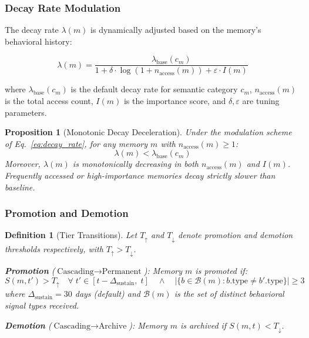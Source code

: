\documentclass[11pt,a4paper]{article}
\newtheorem{definition}{Definition}
\newtheorem{proposition}{Proposition}
\begin{document}
\subsubsection{Decay Rate Modulation}

The decay rate $\lambda(m)$ is dynamically adjusted based on the memory's behavioral history:

\begin{equation}
\lambda(m) = \frac{\lambda_{\text{base}}(c_m)}{1 + \delta \cdot \log(1 + n_{\text{access}}(m)) + \varepsilon \cdot I(m)}
\label{eq:decay_rate}
\end{equation}

\noindent where $\lambda_{\text{base}}(c_m)$ is the default decay rate for semantic category $c_m$, $n_{\text{access}}(m)$ is the total access count, $I(m)$ is the importance score, and $\delta, \varepsilon$ are tuning parameters.

\begin{proposition}[Monotonic Decay Deceleration]
Under the modulation scheme of Eq.~\ref{eq:decay_rate}, for any memory $m$ with $n_{\text{access}}(m) \geq 1$:
$$\lambda(m) < \lambda_{\text{base}}(c_m)$$
Moreover, $\lambda(m)$ is monotonically decreasing in both $n_{\text{access}}(m)$ and $I(m)$. Frequently accessed or high-importance memories decay strictly slower than baseline.
\end{proposition}

\subsubsection{Promotion and Demotion}

\begin{definition}[Tier Transitions]
\label{def:transitions}
Let $T_{\uparrow}$ and $T_{\downarrow}$ denote promotion and demotion thresholds respectively, with $T_{\uparrow} > T_{\downarrow}$.

\textbf{Promotion} ($\text{Cascading} \to \text{Permanent}$): Memory $m$ is promoted if:
\begin{equation}
S(m, t') > T_{\uparrow} \quad \forall \; t' \in [t - \Delta_{\text{sustain}}, \; t] \quad \wedge \quad |\{b \in \mathcal{B}(m) : b.\text{type} \neq b'.\text{type}\}| \geq 3
\label{eq:promotion}
\end{equation}
where $\Delta_{\text{sustain}} = 30$ days (default) and $\mathcal{B}(m)$ is the set of distinct behavioral signal types received.

\textbf{Demotion} ($\text{Cascading} \to \text{Archive}$): Memory $m$ is archived if $S(m, t) < T_{\downarrow}$.
\end{definition}
\end{document}
